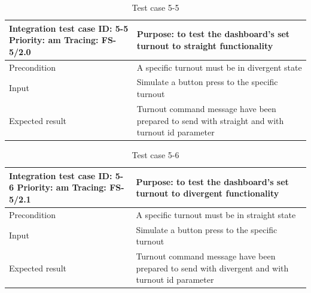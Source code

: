 \begin{table}[H]
	\caption{Test case 5-5}
	\label{table:TCase-FS5-5}
	\begin{center}
		\renewcommand{\arraystretch}{1.8}
		\begin{tabu} 
			to 0.9 \textwidth
			{  X[0.4, c] X[c] }
			\toprule
			Integration test case ID: 5-5 \newline Priority: am \newline Tracing: FS-5/2.0 & Purpose: to test the dashboard's set turnout to straight functionality                         \\ \midrule
			Precondition                                                                   & A specific turnout must be in divergent state                                             \\
			Input                                                                          & Simulate a button press to the specific turnout                                                \\
			Expected result                                                                & Turnout command message have been prepared to send with straight and with turnout id parameter \\ \bottomrule
		\end{tabu}
	\end{center}
\end{table}

\begin{table}[H]
	\caption{Test case 5-6}
	\label{table:TCase-FS5-6}
	\begin{center}
		\renewcommand{\arraystretch}{1.8}
		\begin{tabu} 
			to 0.9 \textwidth
			{  X[0.4, c] X[c] }
			\toprule
			Integration test case ID: 5-6 \newline Priority: am \newline Tracing: FS-5/2.1 & Purpose: to test the dashboard's set turnout to divergent functionality                         \\ \midrule
			Precondition                                                                   & A specific turnout must be in straight state                                                    \\
			Input                                                                          & Simulate a button press to the specific turnout                                                 \\
			Expected result                                                                & Turnout command message have been prepared to send with divergent and with turnout id parameter \\ \bottomrule
		\end{tabu}
	\end{center}
\end{table}

